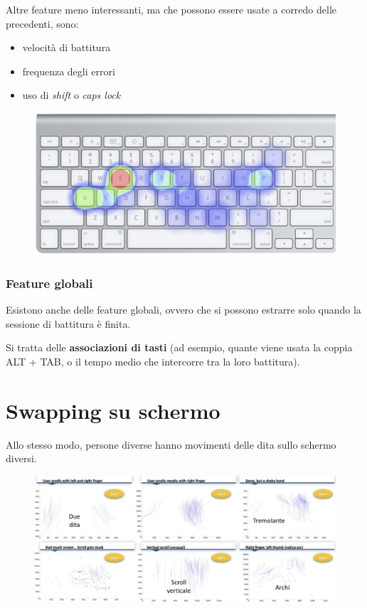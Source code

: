 \documentclass{report}
\begin{document}
\noindent Altre feature meno interessanti, ma che possono essere usate
a corredo delle precedenti, sono:
\begin{itemize}
    \item velocità di battitura
    \item frequenza degli errori
    \item uso di \textit{shift} o \textit{caps lock}
\end{itemize}

\begin{figure}[ht]
    \centering
    \includegraphics[width=0.8\linewidth]{images/tastiera-locali.png}
\end{figure}

\subsubsection{Feature globali}
Esistono anche delle feature globali, ovvero che si possono estrarre
solo quando la sessione di battitura è finita.


\noindent Si tratta delle \textbf{associazioni di tasti} (ad esempio,
quante viene usata la coppia ALT + TAB, o il tempo medio che intercorre
tra la loro battitura).


\section{Swapping su schermo}
Allo stesso modo, persone diverse hanno movimenti delle dita 
sullo schermo diversi.

\begin{figure}[H]
    \centering
    \includegraphics[width=1\linewidth]{images/schermo.png}
\end{figure}
\end{document}
